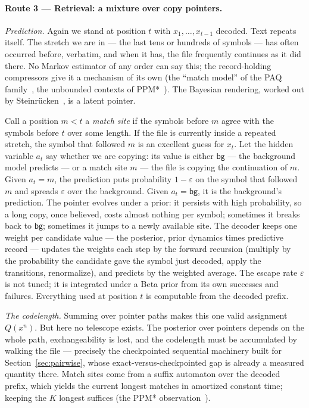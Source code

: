 \documentclass[11pt]{article}
\begin{document}
\paragraph{Route 3 --- Retrieval: a mixture over copy pointers.}

\emph{Prediction.}  Again we stand at position $t$ with
$x_1, \dots, x_{t-1}$ decoded.  Text repeats itself.  The stretch we
are in --- the last tens or hundreds of symbols --- has often
occurred before, verbatim, and when it has, the file frequently
continues as it did there.  No Markov estimator of any order can say
this; the record-holding compressors give it a mechanism of its own
(the ``match model'' of the PAQ family~\cite{paq}, the unbounded
contexts of PPM*~\cite{ppmstar}).  The Bayesian rendering, worked out
by Steinr\"ucken~\cite{steinruecken}, is a latent pointer.

Call a position $m < t$ a \emph{match site} if the symbols before $m$
agree with the symbols before $t$ over some length.  If the file is
currently inside a repeated stretch, the symbol that followed $m$ is
an excellent guess for $x_t$.  Let the hidden variable $a_t$ say
whether we are copying: its value is either $\mathsf{bg}$ --- the
background model predicts --- or a match site $m$ --- the file is
copying the continuation of $m$.  Given $a_t = m$, the prediction
puts probability $1-\varepsilon$ on the symbol that followed $m$ and
spreads $\varepsilon$ over the background.  Given
$a_t = \mathsf{bg}$, it is the background's prediction.  The pointer
evolves under a prior: it persists with high probability, so a long
copy, once believed, costs almost nothing per symbol; sometimes it
breaks back to $\mathsf{bg}$; sometimes it jumps to a newly available
site.  The decoder keeps one weight per candidate value --- the
posterior, prior dynamics times predictive record --- updates the
weights each step by the forward recursion (multiply by the
probability the candidate gave the symbol just decoded, apply the
transitions, renormalize), and predicts by the weighted average.  The
escape rate $\varepsilon$ is not tuned; it is integrated under a Beta
prior from its own successes and failures.  Everything used at
position $t$ is computable from the decoded prefix.

\emph{The codelength.}  Summing over pointer paths makes this one
valid assignment $Q(x^n)$.  But here no telescope exists.  The
posterior over pointers depends on the whole path, exchangeability is
lost, and the codelength must be accumulated by walking the file ---
precisely the checkpointed sequential machinery built for
Section~\ref{sec:pairwise}, whose exact-versus-checkpointed gap is
already a measured quantity there.  Match sites come from a suffix
automaton over the decoded prefix, which yields the current longest
matches in amortized constant time; keeping the $K$ longest suffices
(the PPM* observation~\cite{ppmstar}).
\end{document}
